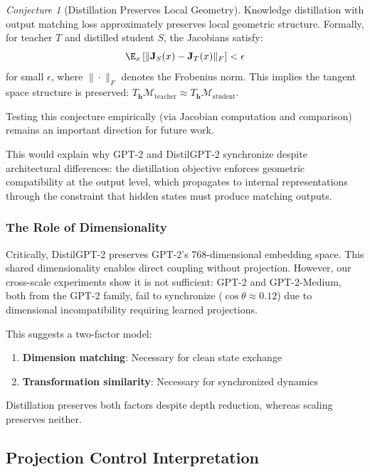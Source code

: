 \documentclass[10pt]{article} %
\theoremstyle{plain}
\theoremstyle{definition}
\theoremstyle{remark}
\newtheorem{conjecture}[theorem]{Conjecture}
\newcommand{\cM}{\mathcal{M}}
\newcommand{\vect}[1]{\bm{#1}}
\newcommand{\mat}[1]{\mathbf{#1}}
\begin{document}
\begin{conjecture}[Distillation Preserves Local Geometry]
\label{conj:tangent}
Knowledge distillation with output matching loss approximately preserves local geometric structure. Formally, for teacher $T$ and distilled student $S$, the Jacobians satisfy:
\begin{equation}
    \E_x\left[\|\mat{J}_S(x) - \mat{J}_T(x)\|_F\right] < \epsilon
\end{equation}
for small $\epsilon$, where $\|\cdot\|_F$ denotes the Frobenius norm. This implies the tangent space structure is preserved: $T_{\vect{h}}\cM_{\text{teacher}} \approx T_{\vect{h}}\cM_{\text{student}}$.
\end{conjecture}

\noindent Testing this conjecture empirically (via Jacobian computation and comparison) remains an important direction for future work.

This would explain why GPT-2 and DistilGPT-2 synchronize despite architectural differences: the distillation objective enforces geometric compatibility at the output level, which propagates to internal representations through the constraint that hidden states must produce matching outputs.

\subsubsection{The Role of Dimensionality}

Critically, DistilGPT-2 preserves GPT-2's 768-dimensional embedding space. This shared dimensionality enables direct coupling without projection. However, our cross-scale experiments show it is not sufficient: GPT-2 and GPT-2-Medium, both from the GPT-2 family, fail to synchronize ($\cos \theta \approx 0.12$) due to dimensional incompatibility requiring learned projections.

This suggests a two-factor model:
\begin{enumerate}
    \item \textbf{Dimension matching}: Necessary for clean state exchange
    \item \textbf{Transformation similarity}: Necessary for synchronized dynamics
\end{enumerate}

Distillation preserves both factors despite depth reduction, whereas scaling preserves neither.

\subsection{Projection Control Interpretation}
\end{document}
